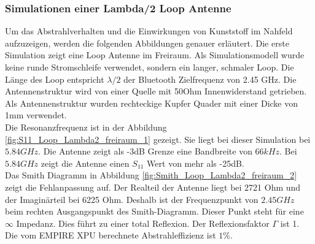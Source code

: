 \subsubsection{Simulationen einer Lambda/2 Loop Antenne}\label{sec:SimL2Loop}
Um das Abstrahlverhalten und die Einwirkungen von Kunststoff im Nahfeld aufzuzeigen, werden die folgenden Abbildungen genauer erläutert.
Die erste Simulation zeigt eine Loop Antenne im Freiraum. Als Simulationsmodell wurde keine runde Stromschleife verwendet, sondern ein langer, schmaler Loop. Die Länge des Loop entspricht $\lambda/2$ der Bluetooth Zielfrequenz von 2.45 GHz. Die Antennenstruktur wird von einer Quelle mit 50Ohm Innenwiderstand getrieben. Als Antennenstruktur wurden  rechteckige Kupfer Quader mit einer Dicke von 1mm verwendet. \\
Die Resonanzfrequenz ist in der Abbildung  \ref{fig:S11_Loop_Lambda2_freiraum_1} gezeigt. Sie liegt bei dieser Simulation bei $5.84 GHz$. Die Antenne zeigt als -3dB Grenze eine Bandbreite von $66kHz$. Bei $5.84 GHz$ zeigt die Antenne einen $S_{11}$ Wert von mehr als -25dB.\\
Das Smith Diagramm in  Abbildung \ref{fig:Smith_Loop_Lambda2_freiraum_2} zeigt die Fehlanpassung auf. Der Realteil der Antenne liegt bei 2721 Ohm und der Imaginärteil bei 6225 Ohm. Deshalb ist der Frequenzpunkt von $2.45 GHz$ beim rechten Ausgangspunkt des Smith-Diagramm. Dieser Punkt steht für eine $\infty$ Impedanz. Dies führt zu einer total Reflexion. Der Reflexionsfaktor $\Gamma$ ist 1. Die vom EMPIRE XPU berechnete Abstrahleffizienz ist $1\%$.

